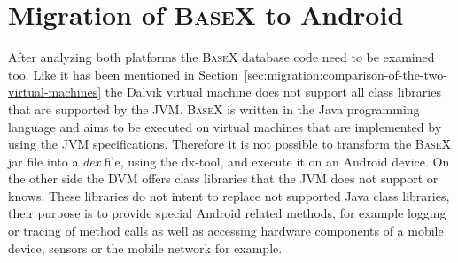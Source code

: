 \section{Migration of \textsc{BaseX} to Android}
\label{sec:migration:migration-of-basex-to-android}
After analyzing both platforms the \textsc{BaseX} database code need to be examined too.
Like it has been mentioned in Section~\ref{sec:migration:comparison-of-the-two-virtual-machines} the Dalvik virtual machine does not support all class libraries that are supported by the JVM.
\textsc{BaseX} is written in the Java programming language and aims to be executed on virtual machines that are implemented by using the JVM specifications.
Therefore it is not possible to transform the \textsc{BaseX} jar file into a \textit{dex} file, using the dx-tool, and execute it on an Android device.
On the other side the DVM offers class libraries that the JVM does not support or knows.
These libraries do not intent to replace not supported Java class libraries, their purpose is to provide special Android related methods, for example logging or tracing of method calls as well as accessing hardware components of a mobile device, sensors or the mobile network for example. 

